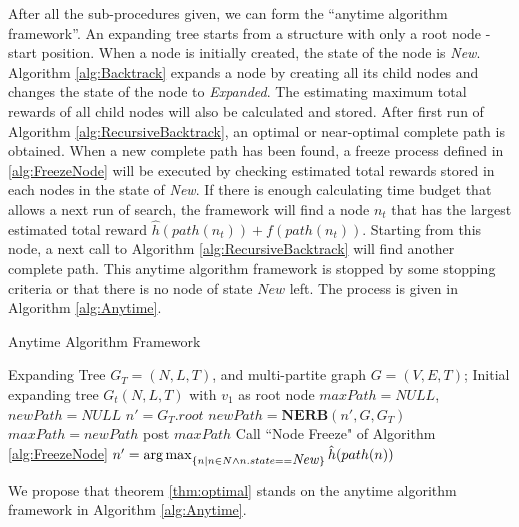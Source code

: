 \documentclass[12pt]{article}
\begin{document}
After all the sub-procedures given, we can form the ``anytime algorithm framework''.
An expanding tree starts from a structure with only a root node - start position.
When a node is initially created, the state of the node is \emph{New}.
Algorithm \ref{alg:Backtrack} expands a node by creating all its child nodes and changes the state of the node to \emph{Expanded}.
The estimating maximum total rewards of all child nodes will also be calculated and stored.
After first run of Algorithm \ref{alg:RecursiveBacktrack}, an optimal or near-optimal complete path is obtained.
When a new complete path has been found, a freeze process defined in \ref{alg:FreezeNode} will be executed by checking estimated total rewards stored in each nodes in the state of \emph{New}.
If there is enough calculating time budget that allows a next run of search, the framework will find a node $ n_{t} $ that has the largest estimated total reward $ \hat{h}(path(n_{t})) + f(path(n_{t})) $.
Starting from this node, a next call to Algorithm \ref{alg:RecursiveBacktrack} will find another complete path.
This anytime algorithm framework is stopped by some stopping criteria or that there is no node of state $ New $ left.
The process is given in Algorithm \ref{alg:Anytime}.

\begin{algorithm}
\caption{Anytime Algorithm Framework}
\label{alg:Anytime}
\begin{algorithmic}[1]
\REQUIRE 
Expanding Tree $ G_{T} = (N, L, T) $, and multi-partite graph $ G = (V, E, T) $;
\STATE Initial expanding tree $ G_{t}(N, L, T) $ with $ v_{1} $ as root node
\STATE $ maxPath = NULL $, $ newPath = NULL $
\STATE $ n' = G_{T}.root $
\STATE $ newPath = \mathbf{NERB}( n', G, G_{T} ) $
\STATE $ maxPath = newPath $
\STATE post $ maxPath $
\ENDIF
\STATE Call ``Node Freeze" of Algorithm \ref{alg:FreezeNode}
\STATE $ n' = \arg \max_{ \{n \mid n \in N \land n.state == \mbox{\emph{New}} \} } \hat{h}(path(n)) $
\ENDWHILE 
\end{algorithmic}
\end{algorithm}

We propose that theorem \ref{thm:optimal} stands on the anytime algorithm framework in Algorithm \ref{alg:Anytime}.
\end{document}
